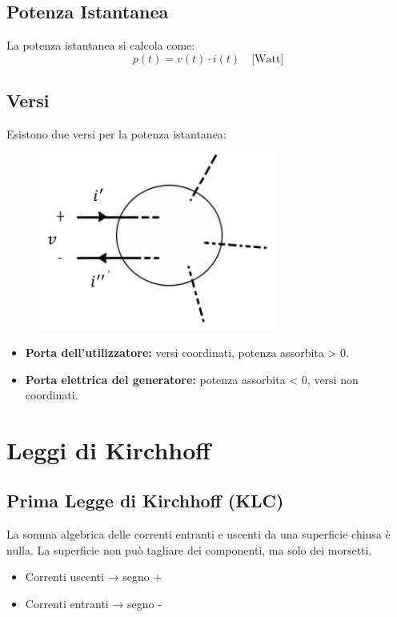\subsection*{Potenza Istantanea}
La potenza istantanea si calcola come:
\[
p(t) = v(t) \cdot i(t) \quad \text{[Watt]}
\]

\subsection*{Versi}
Esistono due versi per la potenza istantanea:

\begin{figure}[H]
    \centering
    \includegraphics[width=0.7\textwidth]{capitoli/capitolo2/immagini/image3.png}
\end{figure}

\begin{itemize}
    \item \textbf{Porta dell’utilizzatore:} versi coordinati, potenza assorbita > 0.
    \item \textbf{Porta elettrica del generatore:} potenza assorbita < 0, versi non coordinati.
\end{itemize}

\section{Leggi di Kirchhoff}

\subsection*{Prima Legge di Kirchhoff (KLC)}
La somma algebrica delle correnti entranti e uscenti da una superficie chiusa è nulla. La superficie non può tagliare dei componenti, ma solo dei morsetti.

\begin{itemize}
    \item Correnti uscenti → segno +
    \item Correnti entranti → segno -
\end{itemize}

